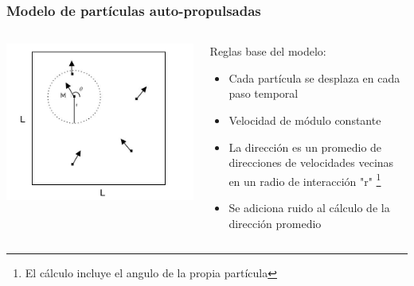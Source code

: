 %
\begin{frame}
\frametitle{Modelo de partículas auto-propulsadas}
\begin{columns}[T] %
    \begin{column}{0.4\textwidth}
      \begin{center}
        \includegraphics[width=\textwidth]{images/model.jpeg} %
      \end{center}
    \end{column}
    \begin{column}{0.6\textwidth}
        \footnotesize Reglas base del modelo:
        \begin{itemize}
            \item Cada partícula se desplaza en cada paso temporal
            \item Velocidad de módulo constante
            \item La dirección es un promedio de direcciones de velocidades vecinas en un radio de interacción "r" \footnote{El cálculo incluye el angulo de la propia partícula}
            \item Se adiciona ruido al cálculo de la dirección promedio    
        \end{itemize}
    \end{column}
\end{columns}
\end{frame}

%

